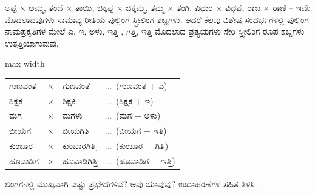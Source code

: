 
\indent ಅಪ್ಪ \ensuremath{\times} ಅಮ್ಮ, ತಂದೆ \ensuremath{\times} ತಾಯಿ, ಚಿಕ್ಕಪ್ಪ \ensuremath{\times} ಚಿಕ್ಕಮ್ಮ, ತಮ್ಮ \ensuremath{\times} ತಂಗಿ, ವಿಧುರ \ensuremath{\times} ವಿಧವೆ, ರಾಜ \ensuremath{\times} ರಾಣಿ -- ಇವೇ ಮೊದಲಾದವುಗಳು ಸಾಮಾನ್ಯ ರೀತಿಯ ಪುಲ್ಲಿಂಗ-ಸ್ತ್ರೀಲಿಂಗ ಶಬ್ದಗಳು. ಆದರೆ ಕೆಲವು ವಿಶೇಷ ಸಂದರ್ಭಗಳಲ್ಲಿ ಪುಲ್ಲಿಂಗ ನಾಮಪ್ರಕೃತಿಗಳ ಮೇಲೆ ಎ, ಇ, ಅಳು, ಇತ್ತಿ , ಗಿತ್ತಿ, ಇತ್ತಿ ಮೊದಲಾದ ಪ್ರತ್ಯಯಗಳು ಸೇರಿ ಸ್ತ್ರೀಲಿಂಗ ರೂಪ ಶಬ್ದಗಳು ಉತ್ಪತ್ತಿಯಾಗುವುವು.\par

\vspace{3pt plus 2pt}\noindent\hspace*{1.2em}\par\vspace{1pt}

\begin{kbvderiv}
\vspace{4pt plus 3pt minus 1pt}
\begin{center}\begin{adjustbox}{max width=\textwidth}
{\renewcommand{\arraystretch}{1.22}\setlength{\tabcolsep}{5pt}
\begin{tabular}{l c l l}
ಗುಣವಂತ & $\times$ & ಗುಣವಂತೆ & \ldots\ (ಗುಣವಂತ + ಎ) \\
ಶಿಕ್ಷಕ & $\times$ & ಶಿಕ್ಷಕಿ & \ldots\ (ಶಿಕ್ಷಕ + ಇ) \\
ಮಗ & $\times$ & ಮಗಳು & \ldots\ (ಮಗ + ಅಳು) \\
ಬೀಯಗ & $\times$ & ಬೀಯಗಿತಿ & \ldots\ (ಬೀಯಗ + ಇತಿ) \\
ಕುಂಬಾರ & $\times$ & ಕುಂಬಾರಗಿತ್ತಿ & \ldots\ (ಕುಂಬಾರ + ಗಿತ್ತಿ) \\
ಹೂವಾಡಿಗ & $\times$ & ಹೂವಾಡಿಗಿತ್ತಿ & \ldots\ (ಹೂವಾಡಿಗ + ಇತ್ತಿ) \\
\end{tabular}}
\end{adjustbox}\end{center}
\vspace{4pt plus 3pt minus 1pt}
\end{kbvderiv}


\vspace{2.5pt plus 3pt minus 0.5pt}\noindent\hspace*{1.2em}\hspace{0.55em}ಲಿಂಗಗಳಲ್ಲಿ ಮುಖ್ಯವಾಗಿ ಎಷ್ಟು ಪ್ರಭೇದಗಳಿವೆ? ಅವು ಯಾವುವು? ಉದಾಹರಣೆಗಳ ಸಹಿತ ತಿಳಿಸಿ.\par

